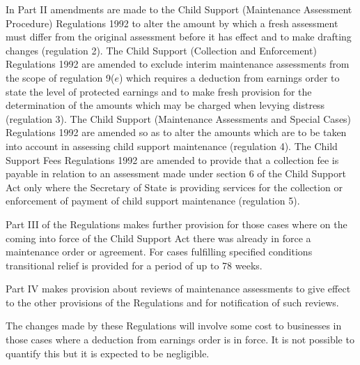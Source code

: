 \documentclass[12pt,a4paper]{article}
\begin{document}
  In Part II amendments are made to the Child Support (Maintenance Assessment Procedure) Regulations 1992 to alter the amount by which a fresh assessment must differ from the original assessment before it has effect and to make drafting changes (regulation 2). The Child Support (Collection and Enforcement) Regulations 1992 are amended to exclude interim maintenance assessments from the scope of regulation 9($e$) which requires a deduction from earnings order to state the level of protected earnings and to make fresh provision for the determination of the amounts which may be charged when levying distress (regulation 3). The Child Support (Maintenance Assessments and Special Cases) Regulations 1992 are amended so as to alter the amounts which are to be taken into account in assessing child support maintenance (regulation 4). The Child Support Fees Regulations 1992 are amended to provide that a collection fee is payable in relation to an assessment made under section 6 of the Child Support Act only where the Secretary of State is providing services for the collection or enforcement of payment of child support maintenance (regulation 5).

  Part III of the Regulations makes further provision for those cases where on the coming into force of the Child Support Act there was already in force a maintenance order or agreement. For cases fulfilling specified conditions transitional relief is provided for a period of up to 78 weeks.

  Part IV makes provision about reviews of maintenance assessments to give effect to the other provisions of the Regulations and for notification of such reviews.

  The changes made by these Regulations will involve some cost to businesses in those cases where a deduction from earnings order is in force. It is not possible to quantify this but it is expected to be negligible.
\end{document}
